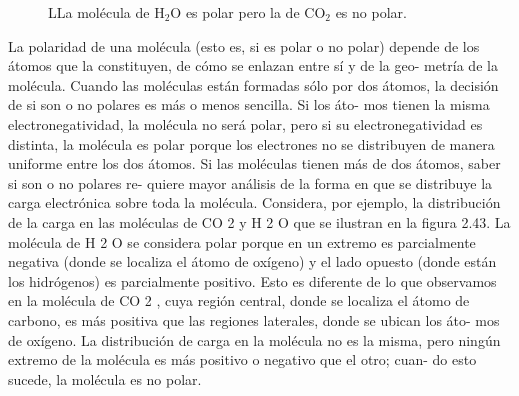 \documentclass[12pt,addpoints,answers]{guia}
\begin{document}
\begin{questions}
{\begin{tcolorbox}
\begin{figure}[H]
                \caption{LLa molécula de H$_2$O es polar pero la de CO$_2$ es no polar.}
                \label{fig:20230321055646}
            \end{figure}
            La polaridad de una molécula (esto es, si es polar o no polar) depende
            de los átomos que la constituyen, de cómo se enlazan entre sí y de la geo-
            metría de la molécula. Cuando las moléculas están formadas sólo por dos
            átomos, la decisión de si son o no polares es más o menos sencilla. Si los áto-
            mos tienen la misma electronegatividad, la molécula no será polar, pero si
            su electronegatividad es distinta, la molécula es polar porque los electrones
            no se distribuyen de manera uniforme entre los dos átomos.
            Si las moléculas tienen más de dos átomos, saber si son o no polares re-
            quiere mayor análisis de la forma en que se distribuye la carga electrónica
            sobre toda la molécula. Considera, por ejemplo, la distribución de la carga
            en las moléculas de CO 2 y H 2 O que se ilustran en la figura 2.43. La molécula
            de H 2 O se considera polar porque en un extremo es parcialmente negativa
            (donde se localiza el átomo de oxígeno) y el lado opuesto (donde están los
            hidrógenos) es parcialmente positivo. Esto es diferente de lo que observamos
            en la molécula de CO 2 , cuya región central, donde se localiza el átomo de
            carbono, es más positiva que las regiones laterales, donde se ubican los áto-
            mos de oxígeno. La distribución de carga en la molécula no es la misma, pero
            ningún extremo de la molécula es más positivo o negativo que el otro; cuan-
            do esto sucede, la molécula es no polar.
        \end{tcolorbox}
    }
\end{questions}
\end{document}
